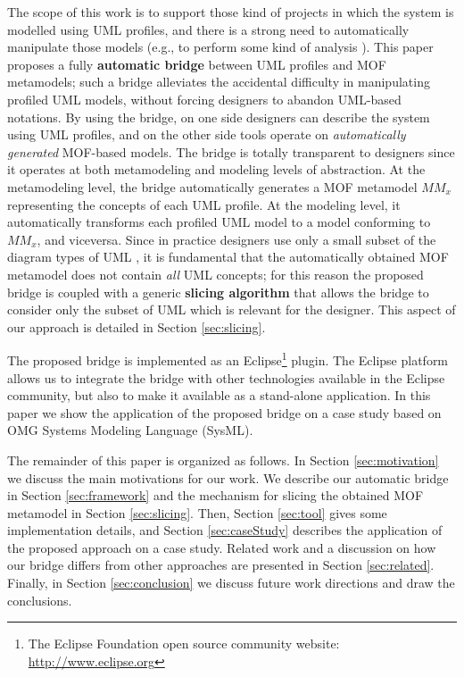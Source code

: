 The scope of this work is to support those kind of projects in which the system is modelled using UML profiles, and there is a strong need to 
automatically manipulate those models (e.g., to perform some kind of analysis \cite{UMLprofilesAnalysis}).
This paper proposes a fully \textbf{automatic bridge} between UML profiles and MOF metamodels; such a bridge alleviates the accidental difficulty in manipulating profiled UML models, without forcing designers to abandon UML-based notations.
By using the bridge, on one side designers can describe the system using UML profiles, and on the other side tools operate
on \textit{automatically generated} MOF-based models.
The bridge is totally transparent to designers since it operates at both metamodeling and modeling levels of abstraction.
At the metamodeling level, the bridge automatically generates a MOF metamodel $MM_x$ representing the concepts of each UML profile.
At the modeling level, it automatically transforms each profiled UML model to a model conforming to $MM_x$, and viceversa.
Since in practice designers use only a small subset of the diagram types of UML \cite{france}, 
it is fundamental that the automatically obtained MOF metamodel does not contain \textit{all} UML concepts;
for this reason the proposed bridge is coupled with a generic \textbf{slicing algorithm} that allows the bridge to consider only the subset of UML which is relevant for the designer. This aspect of our approach is detailed in Section \ref{sec:slicing}. 

The proposed bridge is implemented as an Eclipse\footnote{The Eclipse Foundation open source community website: 
\small{\url{http://www.eclipse.org}}} plugin. The Eclipse platform allows us to integrate the bridge 
with other technologies available in the Eclipse community, but also to make it available as a stand-alone application.
In this paper we show the application of the proposed bridge on a case study based on OMG Systems Modeling Language (SysML).

The remainder of this paper is organized as follows. In Section \ref{sec:motivation} we discuss the main motivations for our work.
We describe our automatic bridge in Section \ref{sec:framework} and the mechanism for slicing the obtained MOF metamodel 
in Section \ref{sec:slicing}. 
Then, Section \ref{sec:tool} gives some implementation details, and Section \ref{sec:caseStudy} describes the application of
the proposed approach on a case study. Related work and a discussion on how our bridge differs from other approaches
are presented in Section \ref{sec:related}. 
Finally, in Section \ref{sec:conclusion} we discuss future work directions and draw the conclusions. 

















